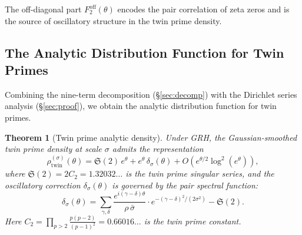 \documentclass[11pt,a4paper]{article}
\newtheorem{theorem}{Theorem}[section]
\theoremstyle{remark}
\begin{document}
The off-diagonal part $F_2^{\mathrm{off}}(\theta)$ encodes the pair correlation of zeta zeros and is the source of oscillatory structure in the twin prime density.

\subsection{The Analytic Distribution Function for Twin Primes}

Combining the nine-term decomposition (\S\ref{sec:decomp}) with the Dirichlet series analysis (\S\ref{sec:proof}), we obtain the analytic distribution function for twin primes.

\begin{theorem}[Twin prime analytic density]\label{thm:twin_density}
Under GRH, the Gaussian-smoothed twin prime density at scale $\sigma$ admits the representation
\begin{equation}\label{eq:twin_density_main}
\boxed{\rho_{\mathrm{twin}}^{(\sigma)}(\theta) = \mathfrak{S}(2)\,e^{\theta} + e^{\theta}\,\delta_\sigma(\theta) + O\!\left(e^{\theta/2}\log^2(e^\theta)\right),}
\end{equation}
where $\mathfrak{S}(2) = 2C_2 = 1.32032\ldots$ is the twin prime singular series, and the oscillatory correction $\delta_\sigma(\theta)$ is governed by the pair spectral function:
\begin{equation}\label{eq:delta_sigma}
\delta_\sigma(\theta) = \sum_{\gamma,\delta}\frac{e^{i(\gamma-\delta)\theta}}{\rho\,\bar\sigma}\cdot e^{-(\gamma-\delta)^2/(2\sigma^2)} - \mathfrak{S}(2).
\end{equation}
Here $C_2 = \prod_{p>2}\frac{p(p-2)}{(p-1)^2} = 0.66016\ldots$ is the twin prime constant.
\end{theorem}
\end{document}
